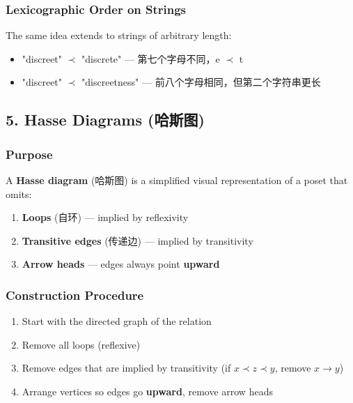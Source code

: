 \documentclass[10pt,a4paper,openany]{ctexbook}
\theoremstyle{definition}
\theoremstyle{remark}
\begin{document}
\subsubsection{Lexicographic Order on Strings}

The same idea extends to strings of arbitrary length:
\begin{itemize}
\item "discreet" $\prec$ "discrete" — 第七个字母不同，e $\prec$ t
\item "discreet" $\prec$ "discreetness" — 前八个字母相同，但第二个字符串更长

\end{itemize}

\vspace{-2pt}

\subsection{5. Hasse Diagrams (哈斯图)}

\subsubsection{Purpose}

A \textbf{Hasse diagram} (哈斯图) is a simplified visual representation of a poset that omits:
\begin{enumerate}
\item \textbf{Loops} (自环) — implied by reflexivity
\item \textbf{Transitive edges} (传递边) — implied by transitivity
\item \textbf{Arrow heads} — edges always point \textbf{upward}

\end{enumerate}

\subsubsection{Construction Procedure}

\begin{enumerate}
\item Start with the directed graph of the relation
\item Remove all loops (reflexive)
\item Remove edges that are implied by transitivity (if $x \prec z \prec y$, remove $x \to y$)
\item Arrange vertices so edges go \textbf{upward}, remove arrow heads

\end{enumerate}
\end{document}
